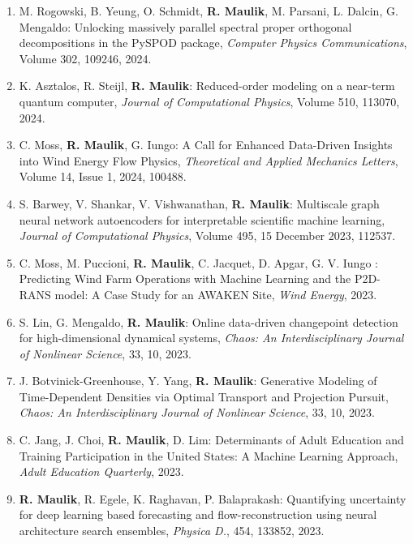 \documentclass[letterpaper]{article}
\begin{document}
\begin{enumerate}
\item M. Rogowski, B. Yeung, O. Schmidt, \textbf{R. Maulik}, M. Parsani, L. Dalcin, G. Mengaldo: Unlocking massively parallel spectral proper orthogonal decompositions in the PySPOD package, {\it Computer Physics Communications}, Volume 302, 109246, 2024.

\item K. Asztalos, R. Steijl, \textbf{R. Maulik}: Reduced-order modeling on a near-term quantum computer, {\it Journal of Computational Physics}, Volume 510, 113070, 2024.

\item C. Moss, \textbf{R. Maulik}, G. Iungo: A Call for Enhanced Data-Driven Insights into Wind Energy Flow Physics, {\it Theoretical and Applied Mechanics Letters}, Volume 14, Issue 1, 2024, 100488.

\item S. Barwey, V. Shankar, V. Vishwanathan, \textbf{R. Maulik}: Multiscale graph neural network autoencoders for interpretable scientific machine learning, {\it Journal of Computational Physics}, Volume 495, 15 December 2023, 112537.

\item C. Moss, M. Puccioni, \textbf{R. Maulik}, C. Jacquet, D. Apgar, G. V. Iungo : Predicting Wind Farm Operations with Machine Learning and the P2D-RANS model: A Case Study for an AWAKEN Site, {\it Wind Energy}, 2023.

\item S. Lin, G. Mengaldo, \textbf{R. Maulik}: Online data-driven changepoint detection for high-dimensional dynamical systems, {\it Chaos: An Interdisciplinary Journal of Nonlinear Science}, 33, 10, 2023.

\item J. Botvinick-Greenhouse, Y. Yang, \textbf{R. Maulik}: Generative Modeling of Time-Dependent Densities via Optimal Transport and Projection Pursuit, {\it Chaos: An Interdisciplinary Journal of Nonlinear Science}, 33, 10, 2023.

\item C. Jang, J. Choi, \textbf{R. Maulik}, D. Lim: Determinants of Adult Education and Training Participation in the United States: A Machine Learning Approach, {\it Adult Education Quarterly}, 2023.

\item \textbf{R. Maulik}, R. Egele, K. Raghavan, P. Balaprakash: Quantifying uncertainty for deep learning based forecasting and flow-reconstruction using neural architecture search ensembles, {\it Physica D.}, 454, 133852, 2023.


\end{enumerate}
\end{document}
